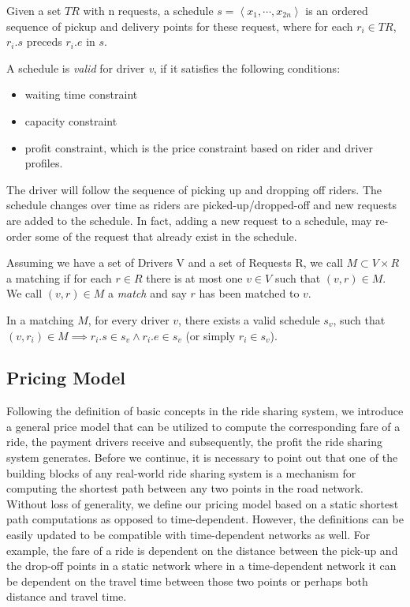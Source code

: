 \begin{definition} [Schedule]
Given a set $TR$ with n requests, a schedule $s= \left\langle x_1, \cdots, x_{2n} \right\rangle$ is an ordered sequence of pickup and delivery points for these request, where for each $r_i \in TR$, $r_i.s$ preceds $r_i.e$ in $s$. 
\end{definition}

A schedule is \textit{valid} for driver \textit{v}, if it satisfies the following conditions:

\begin{itemize}
\item waiting time constraint
\item capacity constraint
\item profit constraint, which is the price constraint based on rider and driver profiles. 
\end{itemize}

The driver will follow the sequence of picking up and dropping off riders. The schedule changes over time as riders are picked-up/dropped-off and new requests are added to the schedule. In fact, adding a new request to a schedule, may re-order some of the request that already exist in the schedule.

\begin{definition} [Matching]
Assuming we have a set of Drivers V and a set of Requests R, we call $M \subset V \times R$ a matching if for each $r \in R$ there is at most one $v \in V$ such that $\left( v, r \right) \in M$. We call $\left( v, r \right) \in M$ a \emph{match} and say $r$ has been matched to $v$.
\end{definition}

\noindent In a matching $M$, for every driver $v$, there exists a valid schedule $s_v$, such that $(v, r_i) \in M \implies r_i.s \in s_v \wedge r_i.e \in s_v$ (or simply $r_i \in s_v$). 

\subsection{Pricing Model}

Following the definition of basic concepts in the ride sharing system, we introduce a general price model that can be utilized to compute the corresponding fare of a ride, the payment drivers receive and subsequently, the profit the ride sharing system generates. Before we continue, it is necessary to point out that one of the building blocks of any real-world ride sharing system is a mechanism for computing the shortest path between any two points in the road network. Without loss of generality, we define our pricing model based on a static shortest path computations as opposed to time-dependent. However, the definitions can be easily updated to be compatible with time-dependent networks as well. For example, the fare of a ride is dependent on the distance between the pick-up and the drop-off points in a static network where in a time-dependent network it can be dependent on the travel time between those two points or perhaps both distance and travel time.

